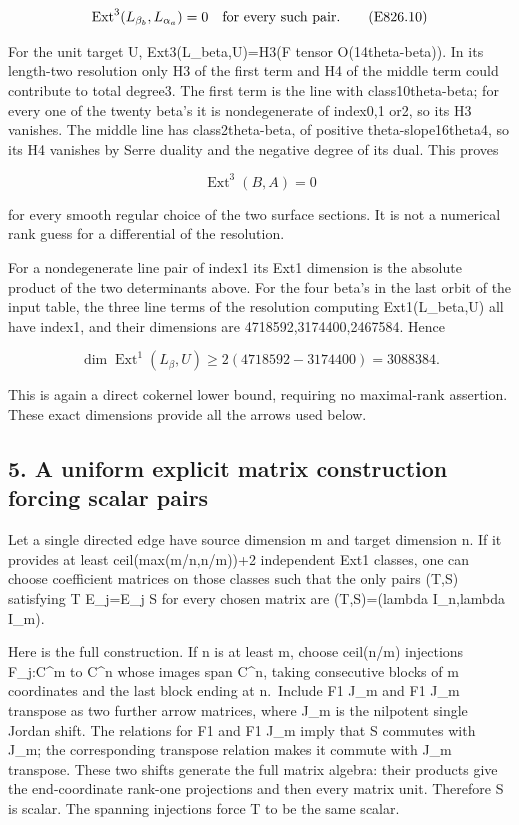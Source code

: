\[
 \operatorname{Ext}^3(L_{\beta_b},L_{\alpha_a})=0
       \quad\hbox{for every such pair.}
 \tag{E826.10}
\]

For the unit target U, Ext3(L\_beta,U)=H3(F tensor O(14theta-beta)). In its
length-two resolution only H3 of the first term and H4 of the middle term
could contribute to total degree3. The first term is the line with
class10theta-beta; for every one of the twenty beta's it is nondegenerate of
index0,1 or2, so its H3 vanishes. The middle line has class2theta-beta, of
positive theta-slope16theta4, so its H4 vanishes by Serre duality and the
negative degree of its dual. This proves

\[
 \operatorname{Ext}^3(B,A)=0
 \tag{E826.11}
\]

for every smooth regular choice of the two surface sections. It is not a
numerical rank guess for a differential of the resolution.

For a nondegenerate line pair of index1 its Ext1 dimension is the absolute
product of the two determinants above. For the four beta's in the last orbit
of the input table, the three line terms of the resolution computing
Ext1(L\_beta,U) all have index1, and their dimensions are
4718592,3174400,2467584. Hence

\[
 \dim\operatorname{Ext}^1(L_\beta,U)
        \ge2(4718592-3174400)=3088384.
 \tag{E826.12}
\]

This is again a direct cokernel lower bound, requiring no maximal-rank
assertion. These exact dimensions provide all the arrows used below.

\subsection{5. A uniform explicit matrix construction forcing scalar
pairs}\label{SF-E826:a-uniform-explicit-matrix-construction-forcing-scalar-pairs}

Let a single directed edge have source dimension m and target dimension n.
If it provides at least ceil(max(m/n,n/m))+2 independent Ext1 classes, one
can choose coefficient matrices on those classes such that the only pairs
(T,S) satisfying T E\_j=E\_j S for every chosen matrix are (T,S)=(lambda
I\_n,lambda I\_m).

Here is the full construction. If n is at least m, choose ceil(n/m)
injections F\_j:C\^{}m to C\^{}n whose images span C\^{}n, taking
consecutive blocks of m coordinates and the last block ending at n.~Include
F1 J\_m and F1 J\_m transpose as two further arrow matrices, where J\_m is
the nilpotent single Jordan shift. The relations for F1 and F1 J\_m imply
that S commutes with J\_m; the corresponding transpose relation makes it
commute with J\_m transpose. These two shifts generate the full matrix
algebra: their products give the end-coordinate rank-one projections and
then every matrix unit. Therefore S is scalar. The spanning injections force
T to be the same scalar.

